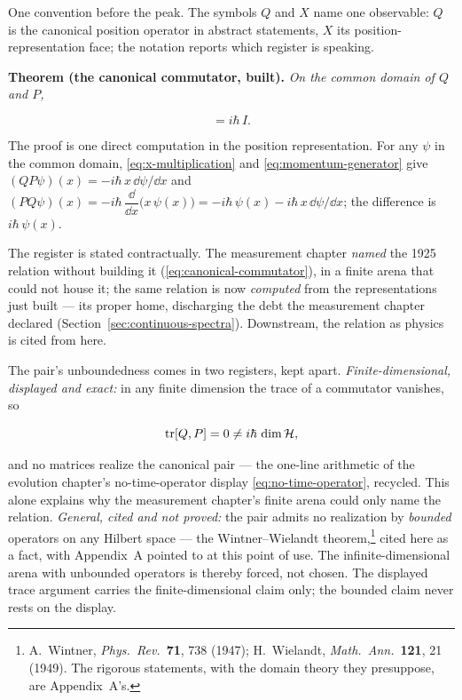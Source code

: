 One convention before the peak. The symbols $Q$ and $X$ name one observable: $Q$ is the canonical position operator in abstract statements, $X$ its position-representation face; the notation reports which register is speaking.

\medskip\noindent\textbf{Theorem (the canonical commutator, built).} \emph{On the common domain of $Q$ and $P$,}
\begin{linenomath}
    \begin{equation}
        [Q, P] = i\hbar\,I .
        \label{eq:canonical-commutator-built}
    \end{equation}
\end{linenomath}
The proof is one direct computation in the position representation. For any $\psi$ in the common domain, \eqref{eq:x-multiplication} and \eqref{eq:momentum-generator} give $(QP\psi)(x) = -i\hbar\,x\,\dd\psi/\dd x$ and $(PQ\psi)(x) = -i\hbar\,\dfrac{\dd}{\dd x}\bigl(x\,\psi(x)\bigr) = -i\hbar\,\psi(x) - i\hbar\,x\,\dd\psi/\dd x$; the difference is $i\hbar\,\psi(x)$.

The register is stated contractually. The measurement chapter \emph{named} the 1925 relation without building it (\eqref{eq:canonical-commutator}), in a finite arena that could not house it; the same relation is now \emph{computed} from the representations just built --- its proper home, discharging the debt the measurement chapter declared (Section~\ref{sec:continuous-spectra}). Downstream, the relation as physics is cited from here.

\begin{note}
The pair's unboundedness comes in two registers, kept apart. \emph{Finite-dimensional, displayed and exact:} in any finite dimension the trace of a commutator vanishes, so
\begin{linenomath}
    \begin{equation}
        \mathrm{tr}[Q, P] = 0 \neq i\hbar\,\dim\mathcal{H},
        \label{eq:trace-obstruction}
    \end{equation}
\end{linenomath}
and no matrices realize the canonical pair --- the one-line arithmetic of the evolution chapter's no-time-operator display \eqref{eq:no-time-operator}, recycled. This alone explains why the measurement chapter's finite arena could only name the relation. \emph{General, cited and not proved:} the pair admits no realization by \emph{bounded} operators on any Hilbert space --- the Wintner--Wielandt theorem,\footnote{A.~Wintner, \emph{Phys.~Rev.}~\textbf{71}, 738 (1947); H.~Wielandt, \emph{Math.~Ann.}~\textbf{121}, 21 (1949). The rigorous statements, with the domain theory they presuppose, are Appendix~A's.} cited here as a fact, with Appendix~A pointed to at this point of use. The infinite-dimensional arena with unbounded operators is thereby forced, not chosen. The displayed trace argument carries the finite-dimensional claim only; the bounded claim never rests on the display.
\end{note}

